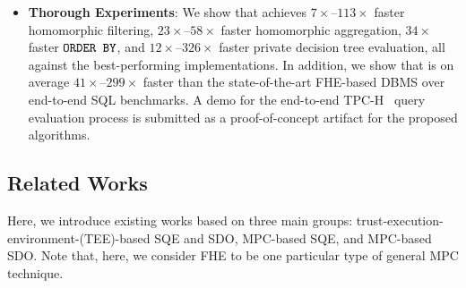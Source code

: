 \begin{itemize}
    
    \item {\bf{Thorough Experiments}}: 
    We show that \NAME achieves $7\times$--$113\times$ faster homomorphic
    filtering, $23\times$--$58\times$ faster homomorphic aggregation,
    $34\times$ faster $\texttt{ORDER BY}$, and $12\times$--$326\times$ 
    faster private decision tree evaluation, 
    all against the best-performing implementations. In addition,
    we show that \NAME is on average $41\times$--$299\times$
    faster than the state-of-the-art FHE-based DBMS over end-to-end SQL benchmarks. 
    A demo for the 
    end-to-end TPC-H~\cite{tpc_h} query evaluation process is submitted as a 
    proof-of-concept artifact for the proposed algorithms.
    
\end{itemize}

\subsection{Related Works}\label{sec:relatedworks}
Here, we introduce existing works based on three main groups: 
trust-execution-environment-(TEE)-based SQE and SDO, 
MPC-based SQE, and MPC-based SDO. Note that, here, we consider FHE
to be one particular type of general MPC technique.

